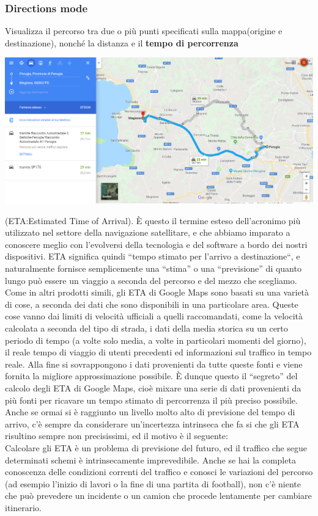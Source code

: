 \documentclass[]{scrartcl}
\begin{document}
\subsubsection{Directions mode}
Visualizza il percorso tra due o più punti specificati sulla mappa(origine e destinazione), nonché la distanza e il \textbf{tempo di percorrenza}
\begin{center}
	\includegraphics[width=0.9\linewidth]{directionMode}
\end{center}
 (ETA:Estimated Time of Arrival). È  questo il termine esteso dell’acronimo più utilizzato nel settore della navigazione satellitare, e che abbiamo imparato a conoscere meglio con l’evolversi della tecnologia e del software a bordo dei nostri dispositivi. ETA significa quindi “tempo stimato per l’arrivo a destinazione“, e naturalmente fornisce semplicemente una “stima” o una “previsione” di quanto lungo può essere un viaggio a seconda del percorso e del mezzo che scegliamo.
Come in altri prodotti simili, gli ETA di Google Maps sono basati su una varietà di cose, a seconda dei dati che sono disponibili in una particolare area. Queste cose vanno dai limiti di velocità ufficiali a quelli raccomandati, come la velocità calcolata a seconda del tipo di strada, i dati della media storica su un certo periodo di tempo (a volte solo media, a volte in particolari momenti del giorno), il reale tempo di viaggio di utenti precedenti ed informazioni sul traffico in tempo reale. Alla fine si sovrappongono i dati provenienti da tutte queste fonti e viene fornita la migliore approssimazione possibile. È dunque questo il “segreto” del calcolo degli ETA di Google Maps, cioè mixare una serie di dati provenienti da più fonti per ricavare un tempo stimato di percorrenza il più preciso possibile.\\
Anche se ormai si è raggiunto un livello molto alto di previsione del tempo di arrivo, c’è sempre da considerare un’incertezza intrinseca che fa si che gli ETA risultino sempre non precisissimi, ed il motivo è il seguente:\\
Calcolare gli ETA è un problema di previsione del futuro, ed il traffico che segue determinati schemi è intrinsecamente imprevedibile. Anche se hai la completa conoscenza delle condizioni correnti del traffico e conosci le variazioni del percorso (ad esempio l’inizio di lavori o la fine di una partita di football), non c’è niente che può prevedere un incidente o un camion che procede lentamente per cambiare itinerario.
\end{document}
